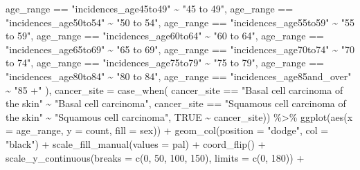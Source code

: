 \documentclass[
]{article}
\newenvironment{Shaded}{\begin{snugshade}}{\end{snugshade}}
\newcommand{\AttributeTok}[1]{\textcolor[rgb]{0.77,0.63,0.00}{#1}}
\newcommand{\ConstantTok}[1]{\textcolor[rgb]{0.00,0.00,0.00}{#1}}
\newcommand{\DecValTok}[1]{\textcolor[rgb]{0.00,0.00,0.81}{#1}}
\newcommand{\FunctionTok}[1]{\textcolor[rgb]{0.00,0.00,0.00}{#1}}
\newcommand{\NormalTok}[1]{#1}
\newcommand{\SpecialCharTok}[1]{\textcolor[rgb]{0.00,0.00,0.00}{#1}}
\newcommand{\StringTok}[1]{\textcolor[rgb]{0.31,0.60,0.02}{#1}}
\begin{document}
\begin{Shaded}
\begin{Highlighting}[]
\NormalTok{    age\_range }\SpecialCharTok{==} \StringTok{"incidences\_age45to49"} \SpecialCharTok{\textasciitilde{}} \StringTok{"45 to 49"}\NormalTok{,}
\NormalTok{    age\_range }\SpecialCharTok{==} \StringTok{"incidences\_age50to54"} \SpecialCharTok{\textasciitilde{}} \StringTok{"50 to 54"}\NormalTok{,}
\NormalTok{    age\_range }\SpecialCharTok{==} \StringTok{"incidences\_age55to59"} \SpecialCharTok{\textasciitilde{}} \StringTok{"55 to 59"}\NormalTok{,}
\NormalTok{    age\_range }\SpecialCharTok{==} \StringTok{"incidences\_age60to64"} \SpecialCharTok{\textasciitilde{}} \StringTok{"60 to 64"}\NormalTok{,}
\NormalTok{    age\_range }\SpecialCharTok{==} \StringTok{"incidences\_age65to69"} \SpecialCharTok{\textasciitilde{}} \StringTok{"65 to 69"}\NormalTok{,}
\NormalTok{    age\_range }\SpecialCharTok{==} \StringTok{"incidences\_age70to74"} \SpecialCharTok{\textasciitilde{}} \StringTok{"70 to 74"}\NormalTok{,}
\NormalTok{    age\_range }\SpecialCharTok{==} \StringTok{"incidences\_age75to79"} \SpecialCharTok{\textasciitilde{}} \StringTok{"75 to 79"}\NormalTok{,}
\NormalTok{    age\_range }\SpecialCharTok{==} \StringTok{"incidences\_age80to84"} \SpecialCharTok{\textasciitilde{}} \StringTok{"80 to 84"}\NormalTok{,}
\NormalTok{    age\_range }\SpecialCharTok{==} \StringTok{"incidences\_age85and\_over"} \SpecialCharTok{\textasciitilde{}} \StringTok{"85 +"}
\NormalTok{  ),}
  \AttributeTok{cancer\_site =} \FunctionTok{case\_when}\NormalTok{(}
\NormalTok{    cancer\_site }\SpecialCharTok{==} \StringTok{"Basal cell carcinoma of the skin"} \SpecialCharTok{\textasciitilde{}} \StringTok{"Basal cell carcinoma"}\NormalTok{,}
\NormalTok{    cancer\_site }\SpecialCharTok{==} \StringTok{"Squamous cell carcinoma of the skin"} \SpecialCharTok{\textasciitilde{}} \StringTok{"Squamous cell carcinoma"}\NormalTok{,}
    \ConstantTok{TRUE} \SpecialCharTok{\textasciitilde{}}\NormalTok{ cancer\_site)) }\SpecialCharTok{\%\textgreater{}\%} 
  \FunctionTok{ggplot}\NormalTok{(}\FunctionTok{aes}\NormalTok{(}\AttributeTok{x =}\NormalTok{ age\_range, }\AttributeTok{y =}\NormalTok{ count, }\AttributeTok{fill =}\NormalTok{ sex)) }\SpecialCharTok{+}
  \FunctionTok{geom\_col}\NormalTok{(}\AttributeTok{position =} \StringTok{"dodge"}\NormalTok{, }\AttributeTok{col =} \StringTok{"black"}\NormalTok{) }\SpecialCharTok{+}
  \FunctionTok{scale\_fill\_manual}\NormalTok{(}\AttributeTok{values =}\NormalTok{ pal) }\SpecialCharTok{+}
  \FunctionTok{coord\_flip}\NormalTok{() }\SpecialCharTok{+}
  \FunctionTok{scale\_y\_continuous}\NormalTok{(}\AttributeTok{breaks =} \FunctionTok{c}\NormalTok{(}\DecValTok{0}\NormalTok{, }\DecValTok{50}\NormalTok{, }\DecValTok{100}\NormalTok{, }\DecValTok{150}\NormalTok{), }\AttributeTok{limits =} \FunctionTok{c}\NormalTok{(}\DecValTok{0}\NormalTok{, }\DecValTok{180}\NormalTok{)) }\SpecialCharTok{+}

\end{Highlighting}
\end{Shaded}
\end{document}
